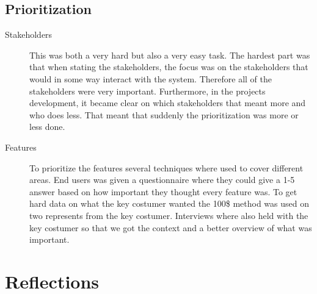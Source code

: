\documentclass[10pt,a4paper]{article}
\begin{document}
\subsection{Prioritization}
\begin{description}
\item[Stakeholders] This was both a very hard but also a very easy task. The hardest part was that when stating the stakeholders, the focus was on the stakeholders that would in some way interact with the system. Therefore all of the stakeholders were very important. Furthermore, in the projects development, it became clear on which stakeholders that meant more and who does less. That meant that suddenly the prioritization was more or less done.
\item[Features] To prioritize the features several techniques where used to cover different areas. End users was given a questionnaire where they could give a 1-5 answer based on how important they thought every feature was. To get hard data on what the key costumer wanted the 100\$ method was used on two represents from the key costumer. Interviews where also held with the key costumer so that we got the context and a better overview of what was important.

\end{description}


\section{Reflections}
\label{sec:ref}
\end{document}
